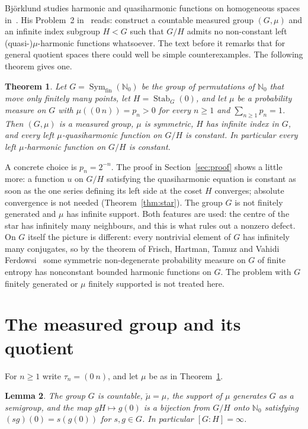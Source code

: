 \documentclass[11pt]{amsart}
\newtheorem{theorem}{Theorem}[section]
\newtheorem{lemma}[theorem]{Lemma}
\theoremstyle{definition}
\theoremstyle{remark}
\newcommand{\N}{\mathbb N}
\DeclareMathOperator{\Sym}{Sym}
\DeclareMathOperator{\Stab}{Stab}
\begin{document}
Bj\"orklund studies harmonic and quasiharmonic functions on homogeneous spaces in~\cite[Appendix~II]{Bj}. His Problem~2 in~\cite[Appendix~II, Section~7.1]{Bj} reads: construct a countable measured group $(G,\mu)$ and an infinite index subgroup $H<G$ such that $G/H$ admits no non-constant left (quasi-)$\mu$-harmonic functions whatsoever. The text before it remarks that for general quotient spaces there could well be simple counterexamples. The following theorem gives one.

\begin{theorem}\label{thm:main}
Let $G=\Sym_{\mathrm{fin}}(\N_0)$ be the group of permutations of $\N_0$ that move only finitely many points, let $H=\Stab_G(0)$, and let $\mu$ be a probability measure on $G$ with $\mu((0\ n))=p_n>0$ for every $n\ge1$ and $\sum_{n\ge1}p_n=1$. Then $(G,\mu)$ is a measured group, $\mu$ is symmetric, $H$ has infinite index in $G$, and every left $\mu$-quasiharmonic function on $G/H$ is constant. In particular every left $\mu$-harmonic function on $G/H$ is constant.
\end{theorem}

A concrete choice is $p_n=2^{-n}$. The proof in Section~\ref{sec:proof} shows a little more: a function $u$ on $G/H$ satisfying the quasiharmonic equation is constant as soon as the one series defining its left side at the coset $H$ converges; absolute convergence is not needed (Theorem~\ref{thm:star}). The group $G$ is not finitely generated and $\mu$ has infinite support. Both features are used: the centre of the star has infinitely many neighbours, and this is what rules out a nonzero defect. On $G$ itself the picture is different: every nontrivial element of $G$ has infinitely many conjugates, so by the theorem of Frisch, Hartman, Tamuz and Vahidi Ferdowsi~\cite{FHTV} some symmetric non-degenerate probability measure on $G$ of finite entropy has nonconstant bounded harmonic functions on $G$. The problem with $G$ finitely generated or $\mu$ finitely supported is not treated here.

\section{The measured group and its quotient}

For $n\ge1$ write $\tau_n=(0\ n)$, and let $\mu$ be as in Theorem~\ref{thm:main}.

\begin{lemma}\label{lem:group}
The group $G$ is countable, $\check\mu=\mu$, the support of $\mu$ generates $G$ as a semigroup, and the map $gH\mapsto g(0)$ is a bijection from $G/H$ onto $\N_0$ satisfying $(sg)(0)=s(g(0))$ for $s,g\in G$. In particular $[G:H]=\infty$.
\end{lemma}
\end{document}
